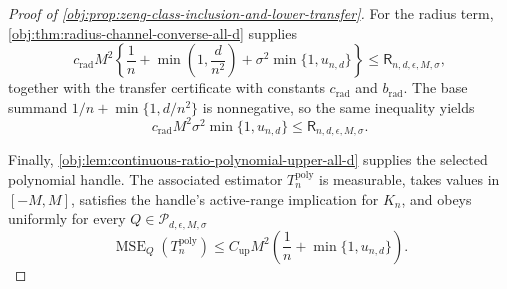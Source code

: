 \documentclass[11pt]{article}
\begin{document}
\begin{proof}[Proof of \cref{obj:prop:zeng-class-inclusion-and-lower-transfer}]
For the radius term, \cref{obj:thm:radius-channel-converse-all-d} supplies
\[
c_{\mathrm{rad}}M^2
\left\{
\frac1n+\min\left(1,\frac d{n^2}\right)
+\sigma^2\min\{1,u_{n,d}\}
\right\}
\le
\mathsf R_{n,d,\epsilon,M,\sigma},
\]
together with the transfer certificate with constants \(c_{\mathrm{rad}}\) and \(b_{\mathrm{rad}}\).  The base summand \(1/n+\min\{1,d/n^2\}\) is nonnegative, so the same inequality yields
\[
c_{\mathrm{rad}}M^2\sigma^2\min\{1,u_{n,d}\}
\le
\mathsf R_{n,d,\epsilon,M,\sigma}.
\]

Finally, \cref{obj:lem:continuous-ratio-polynomial-upper-all-d} supplies the selected polynomial handle.  The associated estimator \(T_n^{\mathrm{poly}}\) is measurable, takes values in \([-M,M]\), satisfies the handle's active-range implication for \(K_n\), and obeys uniformly for every \(Q\in\mathcal P_{d,\epsilon,M,\sigma}\)
\[
\operatorname{MSE}_{Q}(T_n^{\mathrm{poly}})
\le
C_{\mathrm{up}}M^2\left(\frac1n+\min\{1,u_{n,d}\}\right).
\]
\end{proof}
\end{document}
